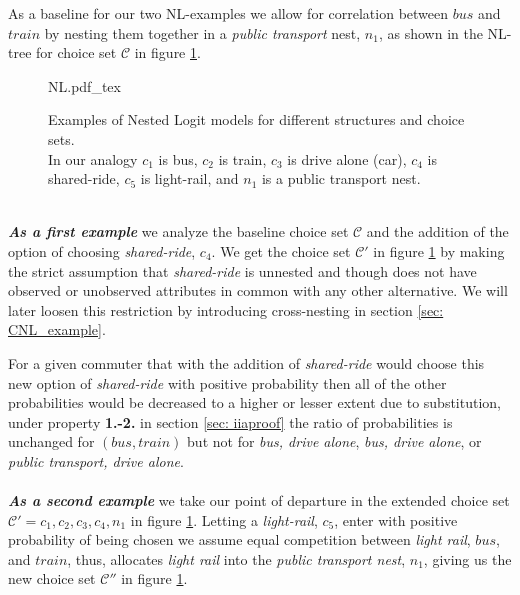 As a baseline for our two NL-examples we allow for correlation between $bus$ and $train$ by nesting them together in a \textit{public transport} nest, $n_1$, as shown in the NL-tree for choice set $\mathcal{C}$ in figure \ref{fig: NL}.
\\
  \begin{figure}[!h]
    \begin{center}
    \def\svgwidth{0.90\columnwidth}
    {NL.pdf_tex}
    \end{center}
    \caption[Examples of Nested Logit models for different structures and choice sets.]{Examples of Nested Logit models for different structures and choice sets. \\
    In our analogy $c_1$ is bus, $c_2$ is train, $c_3$ is drive alone (car), $c_4$ is shared-ride, $c_5$ is light-rail, and $n_1$ is a public transport nest.} \label{fig: NL}
  \end{figure} \\
\textbf{\textit{As a first example}} we analyze the baseline choice set $\mathcal{C}$ and the addition of the option of choosing \textit{shared-ride}, $c_4$. We get the choice set $\mathcal{C}'$ in figure \ref{fig: NL} by making the strict assumption that \textit{shared-ride} is unnested and though does not have observed or unobserved attributes in common with any other alternative. We will later loosen this restriction by introducing cross-nesting in section \ref{sec: CNL_example}.

For a given commuter that with the addition of \textit{shared-ride} would choose this new option of \textit{shared-ride} with positive probability
then all of the other probabilities would be decreased to a higher or lesser extent due to substitution, under property \textbf{1.-2.} in section \ref{sec: iiaproof} the ratio of probabilities is unchanged for $(bus,train)$
but not for \textit{bus, drive alone}, \textit{bus, drive alone}, or \textit{public transport, drive alone}.
\\ \\
\textbf{\textit{As a second example}} we take our point of departure in the extended choice set $\mathcal{C'}=c_1,c_2,c_3,c_4,n_1$ in figure \ref{fig: NL}. Letting a \textit{light-rail}, $c_5$, enter with positive probability of being chosen we assume equal competition between \textit{light rail}, $bus$, and $train$, thus, allocates \textit{light rail} into the \textit{public transport nest}, $n_1$,
giving us the new choice set $\mathcal{C''}$ in figure \ref{fig: NL}.


